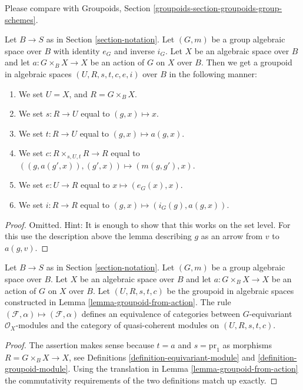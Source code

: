 \noindent
Please compare with
Groupoids, Section \ref{groupoids-section-groupoids-group-schemes}.

\begin{lemma}
\label{lemma-groupoid-from-action}
Let $B \to S$ as in Section \ref{section-notation}.
Let $(G, m)$ be a group algebraic space over $B$ with
identity $e_G$ and inverse $i_G$.
Let $X$ be an algebraic space over $B$ and let $a : G \times_B X \to X$
be an action of $G$ on $X$ over $B$.
Then we get a groupoid in algebraic spaces $(U, R, s, t, c, e, i)$ over $B$
in the following manner:
\begin{enumerate}
\item We set $U = X$, and $R = G \times_B X$.
\item We set $s : R \to U$ equal to $(g, x) \mapsto x$.
\item We set $t : R \to U$ equal to $(g, x) \mapsto a(g, x)$.
\item We set $c : R \times_{s, U, t} R \to R$ equal to
$((g, a(g', x)), (g', x)) \mapsto (m(g, g'), x)$.
\item We set $e : U \to R$ equal to $x \mapsto (e_G(x), x)$.
\item We set $i : R \to R$ equal to $(g, x) \mapsto (i_G(g), a(g, x))$.
\end{enumerate}
\end{lemma}

\begin{proof}
Omitted. Hint: It is enough to show that this works on the set
level. For this use the description above the lemma describing
$g$ as an arrow from $v$ to $a(g, v)$.
\end{proof}

\begin{lemma}
\label{lemma-action-groupoid-modules}
Let $B \to S$ as in Section \ref{section-notation}.
Let $(G, m)$ be a group algebraic space over $B$.
Let $X$ be an algebraic space over $B$ and let $a : G \times_B X \to X$
be an action of $G$ on $X$ over $B$. Let $(U, R, s, t, c)$ be
the groupoid in algebraic spaces constructed in
Lemma \ref{lemma-groupoid-from-action}.
The rule
$(\mathcal{F}, \alpha) \mapsto (\mathcal{F}, \alpha)$ defines
an equivalence of categories between $G$-equivariant
$\mathcal{O}_X$-modules and the category of quasi-coherent
modules on $(U, R, s, t, c)$.
\end{lemma}

\begin{proof}
The assertion makes sense because $t = a$ and $s = \text{pr}_1$
as morphisms $R = G \times_B X \to X$, see
Definitions \ref{definition-equivariant-module} and
\ref{definition-groupoid-module}.
Using the translation in Lemma \ref{lemma-groupoid-from-action}
the commutativity requirements
of the two definitions match up exactly.
\end{proof}





